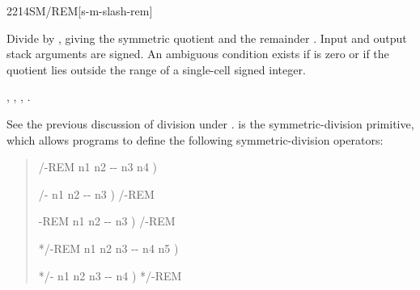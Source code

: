 \vspace*{-1ex}
\begin{worddef}{2214}{SM/REM}[s-m-slash-rem]
\item {}

	Divide  by , giving the symmetric quotient
	 and the remainder . Input and output stack
	arguments are signed. An ambiguous condition exists if 
	is zero or if the quotient lies outside the range of a single-cell
	signed integer.

\see {},
	,
	,
	.

	\begin{rationale} %
		See the previous discussion of division under .
		 is the symmetric-division primitive, which allows
		programs to define the following symmetric-division operators:

		\begin{quote}\ttfamily
			\word{:} /-REM  n1 n2 -{}- n3 n4 )
				   
			\word{;}

			\word{:} /-  n1 n2 -{}- n3 )
				/-REM  
			\word{;}

			\word{:} -REM  n1 n2 -{}- n3 )
				/-REM 
			\word{;}

			\word{:} */-REM  n1 n2 n3 -{}- n4 n5 )
				   
			\word{;}

			\word{:} */-  n1 n2 n3 -{}- n4 )
				*/-REM  
			\word{;}
		\end{quote}
	\end{rationale}


\end{worddef}
